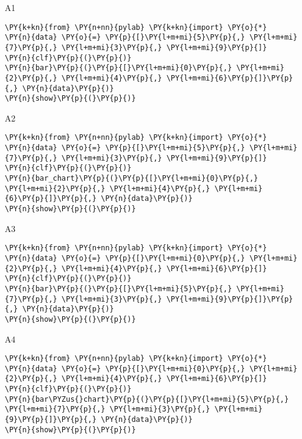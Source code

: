 \begin{enumerate}
\begin{enumerate}
\item[A1] 
\begin{Verbatim}[commandchars=\\\{\}]
\PY{k+kn}{from} \PY{n+nn}{pylab} \PY{k+kn}{import} \PY{o}{*}
\PY{n}{data} \PY{o}{=} \PY{p}{[}\PY{l+m+mi}{5}\PY{p}{,} \PY{l+m+mi}{7}\PY{p}{,} \PY{l+m+mi}{3}\PY{p}{,} \PY{l+m+mi}{9}\PY{p}{]}
\PY{n}{clf}\PY{p}{(}\PY{p}{)}
\PY{n}{bar}\PY{p}{(}\PY{p}{[}\PY{l+m+mi}{0}\PY{p}{,} \PY{l+m+mi}{2}\PY{p}{,} \PY{l+m+mi}{4}\PY{p}{,} \PY{l+m+mi}{6}\PY{p}{]}\PY{p}{,} \PY{n}{data}\PY{p}{)}
\PY{n}{show}\PY{p}{(}\PY{p}{)}
\end{Verbatim}
\item[A2] 
\begin{Verbatim}[commandchars=\\\{\}]
\PY{k+kn}{from} \PY{n+nn}{pylab} \PY{k+kn}{import} \PY{o}{*}
\PY{n}{data} \PY{o}{=} \PY{p}{[}\PY{l+m+mi}{5}\PY{p}{,} \PY{l+m+mi}{7}\PY{p}{,} \PY{l+m+mi}{3}\PY{p}{,} \PY{l+m+mi}{9}\PY{p}{]}
\PY{n}{clf}\PY{p}{(}\PY{p}{)}
\PY{n}{bar_chart}\PY{p}{(}\PY{p}{[}\PY{l+m+mi}{0}\PY{p}{,} \PY{l+m+mi}{2}\PY{p}{,} \PY{l+m+mi}{4}\PY{p}{,} \PY{l+m+mi}{6}\PY{p}{]}\PY{p}{,} \PY{n}{data}\PY{p}{)}
\PY{n}{show}\PY{p}{(}\PY{p}{)}
\end{Verbatim}
\item[A3]
\begin{Verbatim}[commandchars=\\\{\}]
\PY{k+kn}{from} \PY{n+nn}{pylab} \PY{k+kn}{import} \PY{o}{*}
\PY{n}{data} \PY{o}{=} \PY{p}{[}\PY{l+m+mi}{0}\PY{p}{,} \PY{l+m+mi}{2}\PY{p}{,} \PY{l+m+mi}{4}\PY{p}{,} \PY{l+m+mi}{6}\PY{p}{]}
\PY{n}{clf}\PY{p}{(}\PY{p}{)}
\PY{n}{bar}\PY{p}{(}\PY{p}{[}\PY{l+m+mi}{5}\PY{p}{,} \PY{l+m+mi}{7}\PY{p}{,} \PY{l+m+mi}{3}\PY{p}{,} \PY{l+m+mi}{9}\PY{p}{]}\PY{p}{,} \PY{n}{data}\PY{p}{)}
\PY{n}{show}\PY{p}{(}\PY{p}{)}
\end{Verbatim}
\item[A4] 
\begin{Verbatim}[commandchars=\\\{\}]
\PY{k+kn}{from} \PY{n+nn}{pylab} \PY{k+kn}{import} \PY{o}{*}
\PY{n}{data} \PY{o}{=} \PY{p}{[}\PY{l+m+mi}{0}\PY{p}{,} \PY{l+m+mi}{2}\PY{p}{,} \PY{l+m+mi}{4}\PY{p}{,} \PY{l+m+mi}{6}\PY{p}{]}
\PY{n}{clf}\PY{p}{(}\PY{p}{)}
\PY{n}{bar\PYZus{}chart}\PY{p}{(}\PY{p}{[}\PY{l+m+mi}{5}\PY{p}{,} \PY{l+m+mi}{7}\PY{p}{,} \PY{l+m+mi}{3}\PY{p}{,} \PY{l+m+mi}{9}\PY{p}{]}\PY{p}{,} \PY{n}{data}\PY{p}{)}
\PY{n}{show}\PY{p}{(}\PY{p}{)}
\end{Verbatim}
\end{enumerate}

\vspace{6mm}

\end{enumerate}

